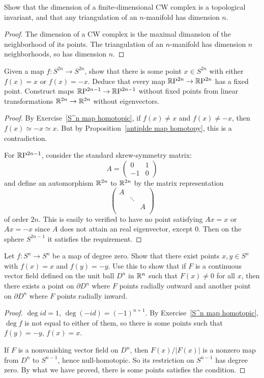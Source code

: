 \begin{exercise}
Show that the dimension of a finite-dimensional CW complex is a topological invariant, and that any triangulation of an $n$-manifold has dimension $n$.
\end{exercise}
\begin{proof}
The dimension of a CW complex is the maximal dimansion of the neighborhood of its points. The triangulation of an $n$-manifold has dimension $n$ neighborhoods, so has dimension $n$.
\end{proof}
\begin{exercise}
Given a map $f:S^{2n}\to S^{2n}$, show that there is some point $x\in S^{2n}$ with either $f(x)=x$ or $f(x)=-x$. Deduce that every map $\mathbb{R}\mathrm{P}^{2n}\to\mathbb{R}\mathrm{P}^{2n}$ has a fixed point. Construct maps $\mathbb{R}\mathrm{P}^{2n-1}\to\mathbb{R}\mathrm{P}^{2n-1}$ without fixed points from linear transformations $\mathbb{R}^{2n}\to\mathbb{R}^{2n}$ without eigenvectors.
\end{exercise}
\begin{proof}
By Exercise~\ref{S^n map homotopic}, if $f(x)\neq x$ and $f(x)\neq -x$, then $f(x)\simeq -x\simeq x$. But by Proposition~\ref{antiplde map homotopy}, this is a contradiction.\par
For $\mathbb{R}\mathrm{P}^{2n-1}$, consider the standard skrew-symmetry matrix:
\[A=\begin{pmatrix}
0&1\\
-1&0
\end{pmatrix}\]
and define an automorphism $\mathbb{R}^{2n}$ to $\mathbb{R}^{2n}$ by the matrix representation
\[\begin{pmatrix}
A&&\\
&\ddots&\\
&&A\\
\end{pmatrix}\]
of order $2n$. This is easily to verified to have no point satisfying $Ax=x$ or $Ax=-x$ since $A$ does not attain an real eigenvector, except $0$. Then on the sphere $S^{2n-1}$ it satisfies the requirement.
\end{proof}
\begin{exercise}
Let $f:S^n\to S^n$ be a map of degree zero. Show that there exist points $x,y\in S^n$ with $f(x)=x$ and $f(y)=-y$. Use this to show that if $F$ is a continuous vector field defined on the unit ball $D^n$ in $\mathbb{R}^n$ such that $F(x)\neq0$ for all $x$, then there exists a point on $\partial D^n$ where $F$ points radially outward and another point on $\partial D^n$ where $F$ points radially inward.
\end{exercise}
\begin{proof}
$\deg id=1$, $\deg(-id)=(-1)^{n+1}$. By Exercise~\ref{S^n map homotopic}, $\deg f$ is not equal to either of them, so there is some points such that $f(y)=-y$, $f(x)=x$.\par
If $F$ is a nonvanishing vector field on $D^n$, then $F(x)/|F(x)|$ is a nonzero map from $D^n$ to $S^{n-1}$, hence null-homotopic. So its restriction on $S^{n-1}$ has degree zero. By what we have proved, there is some points satisfies the condition.
\end{proof}
